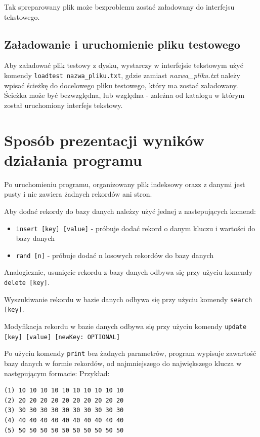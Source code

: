 \documentclass[12pt]{article}
\begin{document}
Tak spreparowany plik może bezproblemu zostać załadowany do interfejsu tekstowego.
\subsection{Załadowanie i uruchomienie pliku testowego}
Aby załadować plik testowy z dysku, wystarczy w interfejsie tekstowym użyć komendy \verb!loadtest nazwa_pliku.txt!,
gdzie zamiast \emph{nazwa\_pliku.txt} należy wpisać ścieżkę do docelowego pliku testowego, który ma zostać załadowany.
Ścieżka może być bezwzględna, lub względna - zależna od katalogu w którym został uruchomiony interfejs tekstowy.

\section{Sposób prezentacji wyników działania programu}

Po uruchomieniu programu, organizowany plik indeksowy orazz z danymi jest pusty i nie zawiera żadnych rekordów ani stron.

Aby dodać rekordy do bazy danych należzy użyć jednej z nastepujących komend:

\begin{itemize}
    \item \verb!insert [key] [value]! - próbuje dodać rekord o danym kluczu i wartości do bazy danych
    \item \verb!rand [n]! - próbuje dodać n losowych rekordów do bazy danych
\end{itemize}

Analogicznie, usunięcie rekordu z bazy danych odbywa się przy użyciu komendy \verb!delete [key]!.

Wyszukiwanie rekordu w bazie danych odbywa się przy użyciu komendy \verb!search [key]!.

Modyfikacja rekordu w bazie danych odbywa się przy użyciu komendy \verb!update [key] [value] [newKey: OPTIONAL]!

Po użyciu komendy \verb!print! bez żadnych parametrów, program wypisuje zawartość bazy danych w formie rekordów, od najmniejszego
do największego klucza w następującym formacie:
Przykład:
\begin{tcolorbox}[colframe=black!75, colback=white!95, title=Output komendy \texttt{print}]
\begin{verbatim}
(1) 10 10 10 10 10 10 10 10 10 10
(2) 20 20 20 20 20 20 20 20 20 20
(3) 30 30 30 30 30 30 30 30 30 30
(4) 40 40 40 40 40 40 40 40 40 40
(5) 50 50 50 50 50 50 50 50 50 50
\end{verbatim}
\end{tcolorbox}
\end{document}
